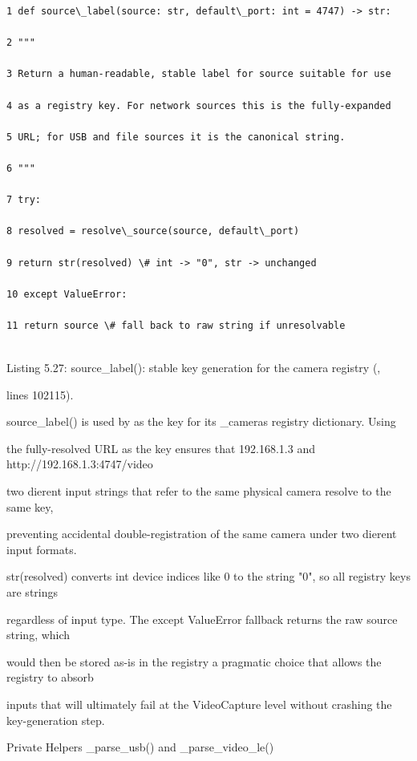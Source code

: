 \begin{listingbox}
	\begin{verbatim}
1 def source\_label(source: str, default\_port: int = 4747) -> str:

2 """

3 Return a human-readable, stable label for source suitable for use

4 as a registry key. For network sources this is the fully-expanded

5 URL; for USB and file sources it is the canonical string.

6 """

7 try:

8 resolved = resolve\_source(source, default\_port)

9 return str(resolved) \# int -> "0", str -> unchanged

10 except ValueError:

11 return source \# fall back to raw string if unresolvable


\end{verbatim}
\end{listingbox}
Listing 5.27: source\_label(): stable key generation for the camera registry (,

lines 102115).

source\_label() is used by as the key for its \_cameras registry dictionary. Using

the fully-resolved URL as the key ensures that 192.168.1.3 and http://192.168.1.3:4747/video

two dierent input strings that refer to the same physical camera  resolve to the same key,

preventing accidental double-registration of the same camera under two dierent input formats.

str(resolved) converts int device indices like 0 to the string "0", so all registry keys are strings

regardless of input type. The except ValueError fallback returns the raw source string, which

would then be stored as-is in the registry  a pragmatic choice that allows the registry to absorb

inputs that will ultimately fail at the VideoCapture level without crashing the key-generation step.

Private Helpers  \_parse\_usb() and \_parse\_video\_le()

